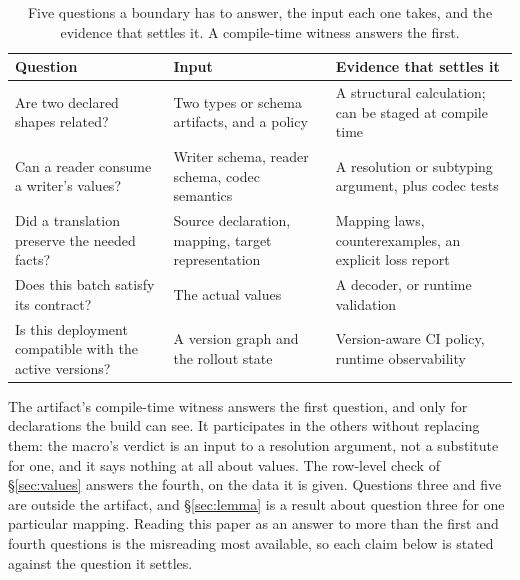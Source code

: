 \begin{table}[t]
  \caption{Five questions a boundary has to answer, the input each one takes, and the evidence that settles it. A compile-time witness answers the first.}
  \label{tab:questions}
  \centering
  \scriptsize
  \begin{tabular}{p{}p{}p{}}
    \toprule
    Question & Input & Evidence that settles it \\
    \midrule
    Are two declared shapes related? & Two types or schema artifacts, and a policy & A structural calculation; can be staged at compile time \\
    Can a reader consume a writer's values? & Writer schema, reader schema, codec semantics & A resolution or subtyping argument, plus codec tests \\
    Did a translation preserve the needed facts? & Source declaration, mapping, target representation & Mapping laws, counterexamples, an explicit loss report \\
    Does this batch satisfy its contract? & The actual values & A decoder, or runtime validation \\
    Is this deployment compatible with the active versions? & A version graph and the rollout state & Version-aware CI policy, runtime observability \\
    \bottomrule
  \end{tabular}
\end{table}

The artifact's compile-time witness answers the first question, and only for declarations the build can see. It participates in the others without replacing them: the macro's verdict is an input to a resolution argument, not a substitute for one, and it says nothing at all about values. The row-level check of \S\ref{sec:values} answers the fourth, on the data it is given. Questions three and five are outside the artifact, and \S\ref{sec:lemma} is a result about question three for one particular mapping. Reading this paper as an answer to more than the first and fourth questions is the misreading most available, so each claim below is stated against the question it settles.

